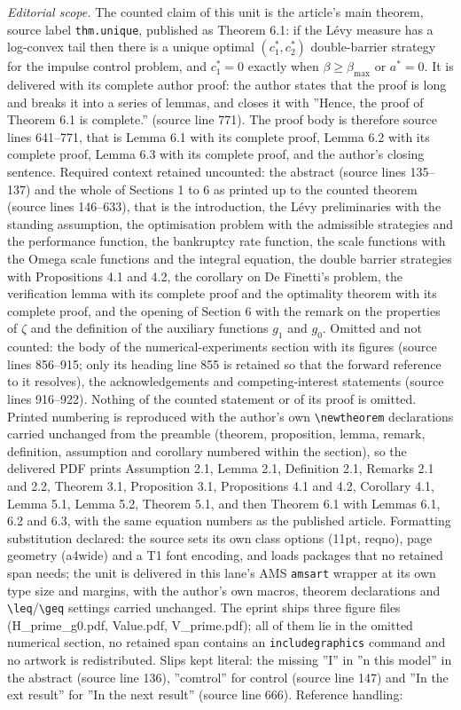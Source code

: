 \documentclass[10pt,a4paper]{amsart}
\renewcommand{\geq}{\geqslant}
\begin{document}
\noindent\textit{Editorial scope.} The counted claim of this unit is the article's main theorem, source label \texttt{thm.unique}, published as Theorem 6.1: if the L\'evy measure has a log-convex tail then there is a unique optimal $(c_1^\ast,c_2^\ast)$ double-barrier strategy for the impulse control problem, and $c_1^\ast=0$ exactly when $\beta\geq\beta_{\max}$ or $a^\ast=0$. It is delivered with its complete author proof: the author states that the proof is long and breaks it into a series of lemmas, and closes it with ''Hence, the proof of Theorem 6.1 is complete.'' (source line 771). The proof body is therefore source lines 641--771, that is Lemma 6.1 with its complete proof, Lemma 6.2 with its complete proof, Lemma 6.3 with its complete proof, and the author's closing sentence. Required context retained uncounted: the abstract (source lines 135--137) and the whole of Sections 1 to 6 as printed up to the counted theorem (source lines 146--633), that is the introduction, the L\'evy preliminaries with the standing assumption, the optimisation problem with the admissible strategies and the performance function, the bankruptcy rate function, the scale functions with the Omega scale functions and the integral equation, the double barrier strategies with Propositions 4.1 and 4.2, the corollary on De Finetti's problem, the verification lemma with its complete proof and the optimality theorem with its complete proof, and the opening of Section 6 with the remark on the properties of $\zeta$ and the definition of the auxiliary functions $g_1$ and $g_0$. Omitted and not counted: the body of the numerical-experiments section with its figures (source lines 856--915; only its heading line 855 is retained so that the forward reference to it resolves), the acknowledgements and competing-interest statements (source lines 916--922). Nothing of the counted statement or of its proof is omitted. Printed numbering is reproduced with the author's own \texttt{\textbackslash newtheorem} declarations carried unchanged from the preamble (theorem, proposition, lemma, remark, definition, assumption and corollary numbered within the section), so the delivered PDF prints Assumption 2.1, Lemma 2.1, Definition 2.1, Remarks 2.1 and 2.2, Theorem 3.1, Proposition 3.1, Propositions 4.1 and 4.2, Corollary 4.1, Lemma 5.1, Lemma 5.2, Theorem 5.1, and then Theorem 6.1 with Lemmas 6.1, 6.2 and 6.3, with the same equation numbers as the published article. Formatting substitution declared: the source sets its own class options (11pt, reqno), page geometry (a4wide) and a T1 font encoding, and loads packages that no retained span needs; the unit is delivered in this lane's AMS \texttt{amsart} wrapper at its own type size and margins, with the author's own macros, theorem declarations and \texttt{\textbackslash leq}/\texttt{\textbackslash geq} settings carried unchanged. The eprint ships three figure files (H\_prime\_g0.pdf, Value.pdf, V\_prime.pdf); all of them lie in the omitted numerical section, no retained span contains an \texttt{includegraphics} command and no artwork is redistributed. Slips kept literal: the missing ''I'' in ''n this model'' in the abstract (source line 136), ''comtrol'' for control (source line 147) and ''In the ext result'' for ''In the next result'' (source line 666). Reference handling: 
\end{document}
